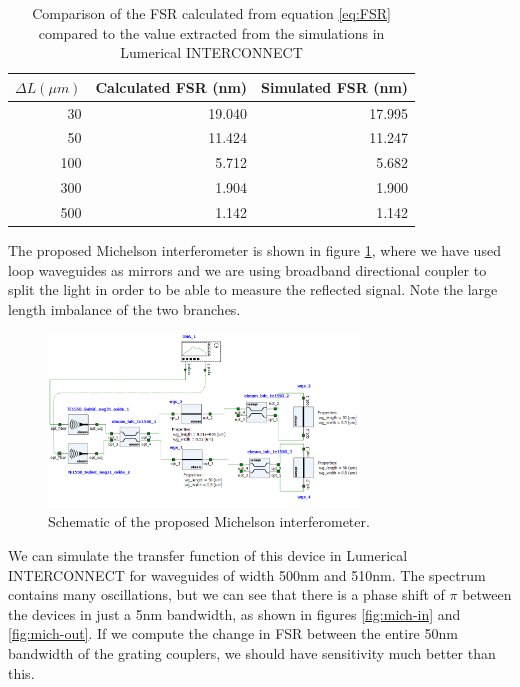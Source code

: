 \documentclass[journal]{IEEEtran}
\begin{document}
\begin{table}
\centering
\begin{tabular}{ r | r | r }
  \hline
  $\Delta L (\mu m)$ & Calculated FSR (nm) & Simulated FSR (nm) \\
  \hline
  30                 & 19.040              & 17.995 \\
  50                 & 11.424              & 11.247 \\
  100                & 5.712               & 5.682 \\
  300                & 1.904               & 1.900 \\
  500                & 1.142               & 1.142 \\
\end{tabular}
\caption{Comparison of the FSR calculated from equation \ref{eq:FSR} compared to the value extracted from the simulations in Lumerical INTERCONNECT}
\label{tab:MZI}
\end{table}

The proposed Michelson interferometer is shown in figure \ref{fig:mich-scheme}, where we have used loop waveguides as mirrors and we are using broadband directional coupler to split the light in order to be able to measure the reflected signal. Note the large length imbalance of the two branches.

\begin{figure}[t!]
  \centering
  \includegraphics[width = 3.25in]{fig/Michaelson_schematic.png}
  \caption{Schematic of the proposed Michelson interferometer.}
  \label{fig:mich-scheme}
\end{figure}

We can simulate the transfer function of this device in Lumerical INTERCONNECT for waveguides of width 500nm and 510nm. The spectrum contains many oscillations, but we can see that there is a phase shift of $\pi$ between the devices in just a 5nm bandwidth, as shown in figures \ref{fig:mich-in} and \ref{fig:mich-out}. If we compute the change in FSR between the entire 50nm bandwidth of the grating couplers, we should have sensitivity much better than this.
\end{document}
